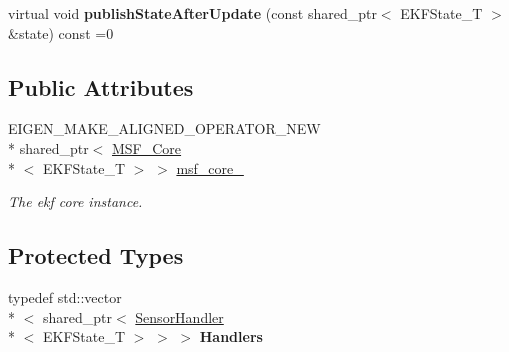 \begin{DoxyCompactItemize}
\item 
\hypertarget{classmsf__core_1_1MSF__SensorManager_abbce1dfe246d7c58ec94529d70c862e5}{virtual void {\bfseries publish\-State\-After\-Update} (const shared\-\_\-ptr$<$ E\-K\-F\-State\-\_\-\-T $>$ \&state) const =0}\label{classmsf__core_1_1MSF__SensorManager_abbce1dfe246d7c58ec94529d70c862e5}

\end{DoxyCompactItemize}
\subsection*{Public Attributes}
\begin{DoxyCompactItemize}
\item 
\hypertarget{classmsf__core_1_1MSF__SensorManager_ad08942e66e76a572cd6425b79e653fd2}{E\-I\-G\-E\-N\-\_\-\-M\-A\-K\-E\-\_\-\-A\-L\-I\-G\-N\-E\-D\-\_\-\-O\-P\-E\-R\-A\-T\-O\-R\-\_\-\-N\-E\-W \\*
shared\-\_\-ptr$<$ \hyperlink{classmsf__core_1_1MSF__Core}{M\-S\-F\-\_\-\-Core}\\*
$<$ E\-K\-F\-State\-\_\-\-T $>$ $>$ \hyperlink{classmsf__core_1_1MSF__SensorManager_ad08942e66e76a572cd6425b79e653fd2}{msf\-\_\-core\-\_\-}}\label{classmsf__core_1_1MSF__SensorManager_ad08942e66e76a572cd6425b79e653fd2}

\begin{DoxyCompactList}\small\item\em The ekf core instance. \end{DoxyCompactList}\end{DoxyCompactItemize}
\subsection*{Protected Types}
\begin{DoxyCompactItemize}
\item 
\hypertarget{classmsf__core_1_1MSF__SensorManager_a4bcde5443748c5580b583f2056d4dc67}{typedef std\-::vector\\*
$<$ shared\-\_\-ptr$<$ \hyperlink{classmsf__core_1_1SensorHandler}{Sensor\-Handler}\\*
$<$ E\-K\-F\-State\-\_\-\-T $>$ $>$ $>$ {\bfseries Handlers}}\label{classmsf__core_1_1MSF__SensorManager_a4bcde5443748c5580b583f2056d4dc67}

\end{DoxyCompactItemize}
